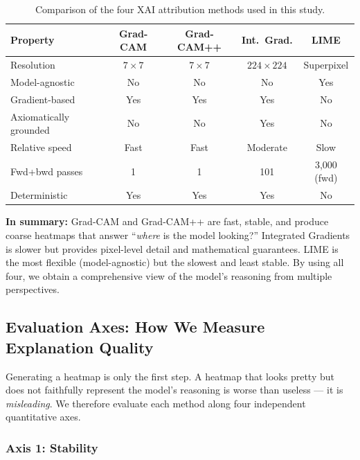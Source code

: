 \documentclass[12pt, a4paper]{article}
\begin{document}
\begin{table}[H]
\centering
\caption{Comparison of the four XAI attribution methods used in this study.}
\label{tab:method_comparison}
\begin{tabular}{lcccc}
\toprule
\textbf{Property} & \textbf{Grad-CAM} & \textbf{Grad-CAM++}
& \textbf{Int.\ Grad.} & \textbf{LIME} \\
\midrule
Resolution       & $7\times7$ & $7\times7$ & $224\times224$ & Superpixel \\
Model-agnostic   & No        & No         & No             & Yes \\
Gradient-based   & Yes       & Yes        & Yes            & No \\
Axiomatically grounded & No  & No         & Yes            & No \\
Relative speed   & Fast      & Fast       & Moderate       & Slow \\
Fwd+bwd passes   & 1         & 1          & 101            & 3{,}000 (fwd) \\
Deterministic    & Yes       & Yes        & Yes            & No \\
\bottomrule
\end{tabular}
\end{table}

\textbf{In summary:} Grad-CAM and Grad-CAM++ are fast, stable, and produce
coarse heatmaps that answer ``\emph{where} is the model looking?''  Integrated
Gradients is slower but provides pixel-level detail and mathematical
guarantees.  LIME is the most flexible (model-agnostic) but the slowest and
least stable.  By using all four, we obtain a comprehensive view of the model's
reasoning from multiple perspectives.


\subsection{Evaluation Axes: How We Measure Explanation Quality}
\label{sec:eval_axes}

Generating a heatmap is only the first step.  A heatmap that looks pretty but
does not faithfully represent the model's reasoning is worse than useless ---
it is \emph{misleading}.  We therefore evaluate each method along four
independent quantitative axes.

\subsubsection{Axis 1: Stability}
\end{document}
